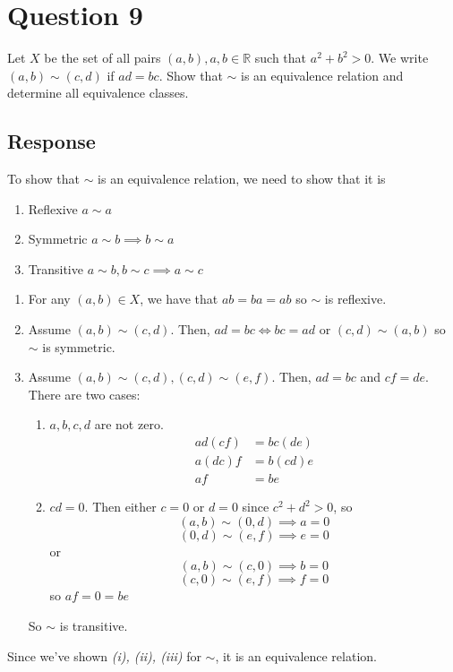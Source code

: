 \documentclass[13pt]{article}
\begin{document}
\newpage
\section*{Question 9}
Let $X$ be the set of all pairs $(a, b), a, b \in \mathbb{R}$ such that $a^2 + b^2 > 0$. We write
$(a, b) \sim (c, d)$ if $ad = bc$. Show that $\sim$ is an equivalence relation and determine all
equivalence classes.

\subsection*{Response}
To show that $\sim$ is an equivalence relation, we need to show that it is
\begin{enumerate}[label=\textit{(\roman*)}]
\item Reflexive $a \sim a$
\item Symmetric $a \sim b \implies b \sim a$
\item Transitive $a \sim b, b \sim c \implies a \sim c$
\end{enumerate}
\begin{enumerate}[label=\textit{(\roman*)}]
\item For any $(a, b) \in X$, we have that $ab = ba = ab$ so $\sim$ is reflexive.
\item Assume $(a, b) \sim (c, d)$. Then, $ad = bc \iff bc = ad$ or $(c, d) \sim (a, b)$ so $\sim$ is
  symmetric.
\item Assume $(a, b) \sim (c, d), (c, d) \sim (e, f)$. Then, $ad = bc$ and $cf = de$. There are two
  cases:
  \begin{enumerate}[label=\textit{(\roman*)}]
  \item $a, b, c, d$ are not zero.
    \begin{align*}
      ad(cf) &= bc(de) \\
      a(dc)f &= b(cd)e \\
      af &= be
    \end{align*}
  \item $cd = 0$. Then either $c = 0$ or $d = 0$ since $c^2 + d^2 > 0$, so
      \[(a, b) \sim (0, d) \implies a = 0\]
      \[(0, d) \sim (e, f) \implies e = 0\]
      or
      \[(a, b) \sim (c, 0) \implies b = 0\]
      \[(c, 0) \sim (e, f) \implies f = 0\]
      so $af = 0 = be$
  \end{enumerate}
  So $\sim$ is transitive.
\end{enumerate}
Since we've shown \textit{(i), (ii), (iii)} for $\sim$, it is an equivalence relation.
\newline
\end{document}
